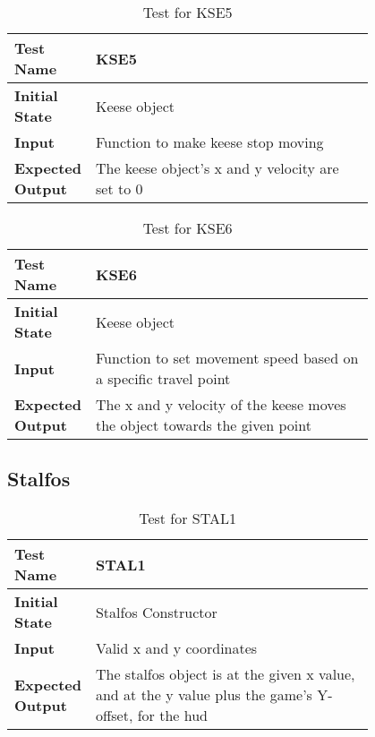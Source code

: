 \documentclass[12pt, titlepage]{article}
\begin{document}
\begin{table}[!htbp]
	
	\begin{tabular}[r]{|l|p{0.8\linewidth}|}
		
		\hline
		
		\textbf{Test Name} & KSE5 \\ 
		\hline
		\textbf{Initial State} & Keese object \\ 
		\hline
		\textbf{Input} & Function to make keese stop moving \\ 
		\hline 
		\textbf{Expected Output} & The keese object's x and y velocity are set to 0  \\ 
		\hline
		
	\end{tabular}
	\caption{Test for KSE5}
	\label{Table}
\end{table}
\begin{table}[!htbp]
	
	\begin{tabular}[r]{|l|p{0.8\linewidth}|}
		
		\hline
		
		\textbf{Test Name} & KSE6 \\ 
		\hline
		\textbf{Initial State} & Keese object \\ 
		\hline
		\textbf{Input} & Function to set movement speed based on a specific travel point \\ 
		\hline 
		\textbf{Expected Output} & The x and y velocity of the keese moves the object towards the given point  \\ 
		\hline
		
	\end{tabular}
	\caption{Test for KSE6}
	\label{Table}
\end{table}

\newpage

\subsection{Stalfos}

\begin{table}[!htbp]
	
	\begin{tabular}[r]{|l|p{0.8\linewidth}|}
		
		\hline
		
		\textbf{Test Name} & STAL1 \\ 
		\hline
		\textbf{Initial State} & Stalfos Constructor \\ 
		\hline
		\textbf{Input} & Valid x and y coordinates \\ 
		\hline 
		\textbf{Expected Output} & The stalfos object is at the given x value, and at the y value plus the game's Y-offset, for the hud  \\ 
		\hline
		
	\end{tabular}
	\caption{Test for STAL1}
	\label{Table}
\end{table}
\end{document}
